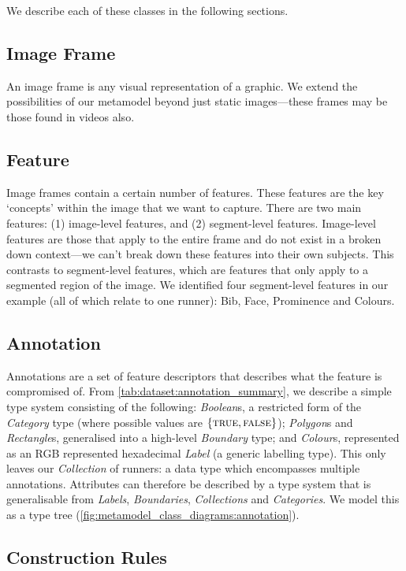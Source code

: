 We describe each of these classes in the following sections.

\subsection{Image Frame}

An image frame is any visual representation of a graphic. We extend the possibilities of our metamodel beyond just static images---these frames may be those found in videos also.

\subsection{Feature}

Image frames contain a certain number of features. These features are the key `concepts' within the image that we want to capture. There are two main features: (1) image-level features, and (2) segment-level features. Image-level features are those that apply to the entire frame and do not exist in a broken down context---we can't break down these features into their own subjects. This contrasts to segment-level features, which are features that only apply to a segmented region of the image. We identified four segment-level features in our example (all of which relate to one runner): Bib, Face, Prominence and Colours.

\subsection{Annotation}

Annotations are a set of feature descriptors that describes what the feature is compromised of. From \cref{tab:dataset:annotation_summary}, we describe a simple type system consisting of the following: \textit{Boolean}s, a restricted form of the \textit{Category} type (where possible values are $\{ \textsc{true}, \textsc{false} \}$); \textit{Polygon}s and \textit{Rectangle}s, generalised into a high-level \textit{Boundary} type; and \textit{Colour}s, represented as an RGB represented hexadecimal \textit{Label} (a generic labelling type). This only leaves our \textit{Collection} of runners: a data type which encompasses multiple annotations. Attributes can therefore be described by a type system that is generalisable from \textit{Labels}, \textit{Boundaries}, \textit{Collections} and \textit{Categories}. We model this as a type tree (\cref{fig:metamodel_class_diagrams:annotation}).

\subsection{Construction Rules} 

